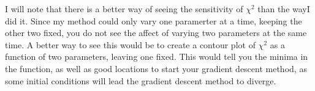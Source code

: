 \documentclass[12pt]{article}
\begin{document}
I will note that there is a better way of seeing the sensitivity of $\chi^2$ than the wayI did it. Since my method could only vary one paramerter at a time, keeping the other two fixed, you do not see the affect of varying two parameters at the same time. A better way to see this would be to create a contour plot of $\chi^2$ as a function of two parameters, leaving one fixed. This would tell you the minima in the function, as well as good locations to start your gradient descent method, as some initial conditions will lead the gradient descent method to diverge. 

\printbibliography




 
\end{document}
